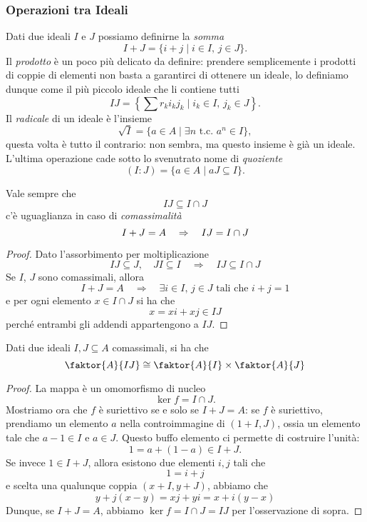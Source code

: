 \begin{multicols}{2}
\subsubsection{Operazioni tra Ideali}
Dati due ideali $ I $ e $ J $ possiamo definirne la \emph{somma}
\[ I+J = \{i + j \mid i \in I,\, j\in J \}. \]
Il \emph{prodotto} è un poco più delicato da definire: prendere semplicemente i prodotti di coppie di elementi non basta a garantirci di ottenere un ideale, lo definiamo dunque come il più piccolo ideale che li contiene tutti
\[ IJ = \left\{ \sum r_ki_kj_k \mid i_k \in I, \, j_k \in J \right\}. \]
Il \emph{radicale} di un ideale è l'insieme
\[ \sqrt{I} = \{ a \in A \mid \exists n \text{ t.c. } a^n \in I \},\]
questa volta è tutto il contrario: non sembra, ma questo insieme è già un ideale.
L'ultima operazione cade sotto lo svenutrato nome di \emph{quoziente}
\[ (I \colon J) = \{ a \in A \mid aJ \subseteq I \}. \]

\begin{remark}
	Vale sempre che
	\[ IJ \subseteq I \cap J \]
	c'è uguaglianza in caso di \emph{comassimalità}
	\[ I + J = A \quad\Rightarrow\quad IJ = I \cap J \]
\end{remark}
\begin{proof}
	Dato l'assorbimento per moltiplicazione
	\[ IJ \subseteq J, \quad JI \subseteq I \quad\Rightarrow\quad IJ \subseteq I \cap J  \]
	Se $ I $, $ J $ sono comassimali, allora
	\[ I + J = A \quad\Rightarrow\quad \exists i \in I, \, j \in J \text{ tali che } i + j = 1 \]
	e per ogni elemento $ x \in I \cap J $ si ha che
	\[ x = xi + xj \in IJ \]
	perché entrambi gli addendi appartengono a $ IJ $.
\end{proof}

\begin{theorem}
	Dati due ideali $ I, J \subseteq A $ comassimali, si ha che
	\[ \faktor{A}{IJ} \cong \faktor{A}{I} \times \faktor{A}{J} \]
\end{theorem}
\begin{proof}
	La mappa
	è un omomorfismo di nucleo
	\[ \ker f = I \cap J. \]
	Mostriamo ora che $ f $ è suriettivo se e solo se $ I + J = A $: se $ f $ è suriettivo, prendiamo un elemento $ a $ nella controimmagine di $ (1 + I, J) $, ossia un elemento tale che 
	$ a-1 \in I $ e $ a \in J $.
	Questo buffo elemento ci permette di costruire l'unità:
	\[ 1 = a + (1-a) \in I + J. \]
	Se invece $ 1 \in I + J $, allora esistono due elementi $ i, j $ tali che \[ 1 = i + j \]
	e scelta una qualunque coppia $ (x + I, y + J) $, abbiamo che
	\[ y + j(x-y) = xj + yi = x + i(y-x) \]
	Dunque, se $ I + J = A $, abbiamo $ \ker f = I \cap J = IJ $ per l'osservazione di sopra.
\end{proof}


\end{multicols}
